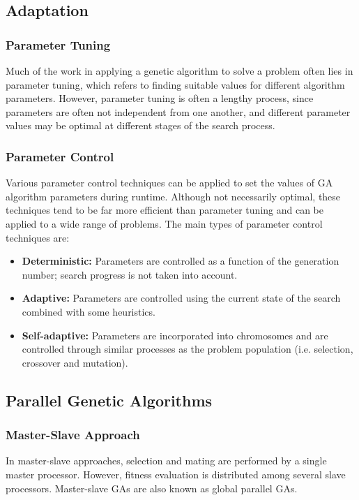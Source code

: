 \documentclass[12pt,titlepage]{article}
\begin{document}
    \subsection{Adaptation}

      \subsubsection{Parameter Tuning}
        Much of the work in applying a genetic algorithm to solve a problem often lies in parameter tuning, which refers to finding suitable values for
        different algorithm parameters. However, parameter tuning is often a lengthy process, since parameters are often not independent from one another,
        and different parameter values may be optimal at different stages of the search process.

      \subsubsection{Parameter Control}
        Various parameter control techniques can be applied to set the values of GA algorithm parameters during runtime. Although not necessarily optimal,
        these techniques tend to be far more efficient than parameter tuning and can be applied to a wide range of problems. The main types of parameter control
        techniques are:
        \begin{itemize}
          \item \textbf{Deterministic:} Parameters are controlled as a function of the generation number; search progress is not taken into account.
          \item \textbf{Adaptive:} Parameters are controlled using the current state of the search combined with some heuristics.
          \item \textbf{Self-adaptive:} Parameters are incorporated into chromosomes and are controlled through similar processes as the problem population
            (i.e. selection, crossover and mutation).
        \end{itemize}

    \subsection{Parallel Genetic Algorithms}

      \subsubsection{Master-Slave Approach}
        In master-slave approaches, selection and mating are performed by a single master processor. However, fitness evaluation is distributed among
        several slave processors. Master-slave GAs are also known as global parallel GAs.
\end{document}
